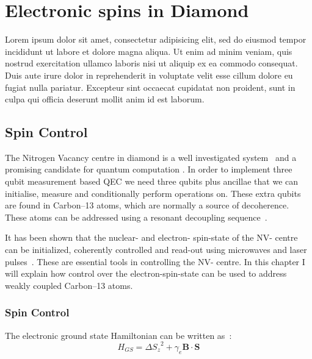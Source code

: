 \chapter{Electronic spins in Diamond}

Lorem ipsum dolor sit amet, consectetur adipisicing elit, sed do eiusmod
tempor incididunt ut labore et dolore magna aliqua. Ut enim ad minim veniam,
quis nostrud exercitation ullamco laboris nisi ut aliquip ex ea commodo
consequat. Duis aute irure dolor in reprehenderit in voluptate velit esse
cillum dolore eu fugiat nulla pariatur. Excepteur sint occaecat cupidatat non
proident, sunt in culpa qui officia deserunt mollit anim id est laborum.
\section{Spin Control}
\label{controlingspinsindiamond}


The Nitrogen Vacancy centre in diamond is a well investigated system~\citep{Doherty2013NitrogenVacancy} and a promising candidate for quantum computation \citep{Childress2013Diamond}. In order to implement three qubit measurement based QEC we need three qubits plus ancillae that we can initialise, measure and conditionally perform operations on. These extra qubits are found in Carbon--13 atoms, which are normally a source of decoherence. These atoms can be addressed using a resonant decoupling sequence~\citep{Taminiau2012Detectiona}.

It has been shown that the nuclear- and electron- spin-state of the NV- centre can be initialized, coherently controlled and read-out using microwaves and laser pulses~\citep{Robledo2011HighFidelity}. These are essential tools in controlling the NV- centre. In this chapter I will explain how control over the electron-spin-state can be used to address weakly coupled Carbon--13 atoms.

\subsection{Spin Control}
\label{spincontrol}

The electronic ground state Hamiltonian can be written as~\citep{Pfaff2013Quantum}:
 \begin{equation}
H_{GS} = \Delta {S_z}^2 + \gamma_e \mathbf{B} \cdot \mathbf{S}
\end{equation}

